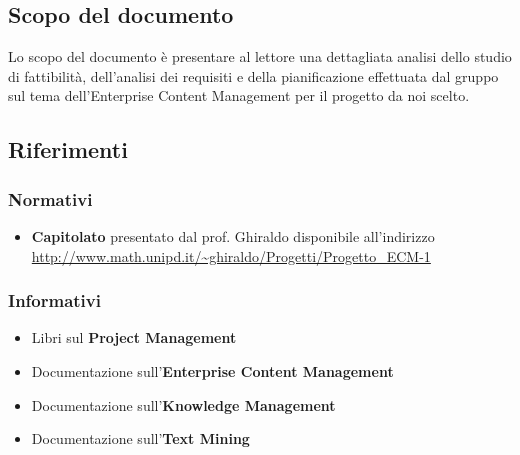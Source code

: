 \subsection{Scopo del documento}
Lo scopo del documento è presentare al lettore una dettagliata analisi dello studio di fattibilità, dell'analisi dei requisiti e della pianificazione effettuata dal gruppo \GRUPPO{} sul tema dell'Enterprise Content Management per il progetto da noi scelto.

\subsection{Riferimenti}

\subsubsection{Normativi}
\begin{itemize}
\item \textbf{Capitolato} presentato dal prof. Ghiraldo disponibile all'indirizzo \url{http://www.math.unipd.it/~ghiraldo/Progetti/Progetto_ECM-1}
\end{itemize}

\subsubsection{Informativi}
\begin{itemize}
\item Libri sul \textbf{Project Management}
\item Documentazione sull'\textbf{Enterprise Content Management}
\item Documentazione sull'\textbf{Knowledge Management}
\item Documentazione sull'\textbf{Text Mining}
\end{itemize} 

\newpage
